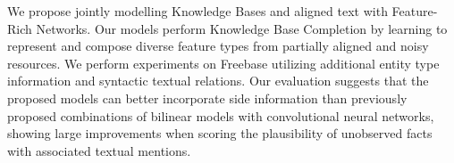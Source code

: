 We propose jointly modelling Knowledge Bases and aligned text with Feature-Rich Networks. Our models perform Knowledge Base Completion by learning to represent and compose diverse feature types from partially aligned and noisy resources. We perform experiments on Freebase utilizing additional entity type information and syntactic textual relations. Our evaluation suggests that the proposed models can better incorporate side information than previously proposed combinations of bilinear models with convolutional neural networks, showing large improvements when scoring the plausibility of unobserved facts with associated textual mentions.
